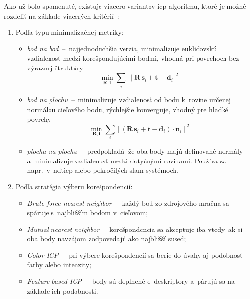       Ako už bolo spomenuté, existuje viacero variantov \acrshort{icp} algoritmu, ktoré je možné rozdeliť na základe viacerých kritérií~\cite{rusinkiewiczEfficientVariantsICP}:
      \begin{enumerate}
        \item Podľa typu minimalizačnej metriky:
        \begin{itemize}
          \item \emph{bod na bod}~--~najjednoduchšia verzia, minimalizuje euklidovskú vzdialenosť medzi korešpondujúcimi bodmi, vhodná pri povrchoch bez výraznej štruktúry
          \[\min_{\bm{R}, \bm{t}} \sum_i {\| \bm{R}\, \bm{s}_i + \bm{t} - \bm{d}_i \Vert}^2\]
          
          \item \emph{bod na plochu}~--~minimalizuje vzdialenosť od bodu k~rovine určenej normálou cieľového bodu, rýchlejšie konverguje, vhodný pre hladké povrchy
          \[ \min_{\bm{R}, \bm{t}} \sum_i {[ ( \bm{R}\, \bm{s}_i + \bm{t} - \bm{d}_i ) \cdot \bm{n}_i ]}^2 \]
          
          \item \emph{plocha na plochu}~--~predpokladá, že oba body majú definované normály a~minimalizuje vzdialenosť medzi dotyčnými rovinami. Používa sa napr.\ v~\acrshort{ndticp} alebo pokročilých \acrshort{slam} systémoch.
        \end{itemize}
        
        \item Podľa stratégia výberu korešpondencií:
        \begin{itemize}
          \item \emph{Brute-force nearest neighbor}~--~každý bod zo zdrojového mračna sa spáruje s~najbližším bodom v~cieľovom;
          \item \emph{Mutual nearest neighbor}~--~korešpondencia sa akceptuje iba vtedy, ak si oba body navzájom zodpovedajú ako najbližší sused;
          \item \emph{Color ICP}~--~pri výbere korešpondencií sa berie do úvahy aj podobnosť farby alebo intenzity;
          \item \emph{Feature-based ICP}~--~body sú doplnené o~deskriptory a~párujú sa na základe ich podobnosti.
        \end{itemize}
        

\end{enumerate}
